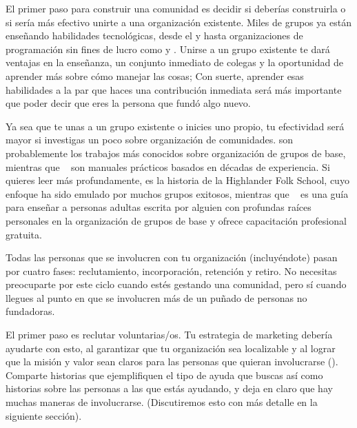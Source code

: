 El primer paso para construir una comunidad es decidir si deberías construirla
o si sería más efectivo unirte a una organización existente.
Miles de grupos ya están enseñando habilidades tecnológicas,
desde el 
y 
hasta organizaciones de programación sin fines de lucro como
y .
Unirse a un grupo existente te dará ventajas en la enseñanza,
un conjunto inmediato de colegas
y la oportunidad de aprender más sobre cómo manejar las cosas;
Con suerte,
aprender esas habilidades a la par que haces una contribución inmediata
será más importante que poder decir que
eres la persona que fundó algo nuevo.

Ya sea que te unas a un grupo existente o inicies uno propio,
tu efectividad será mayor si investigas un poco sobre organización de comunidades.
\cite{Alin1989,Lake2018} son probablemente los trabajos más conocidos sobre organización de grupos de base,
mientras que ~\cite{Brow2007,Midw2010,Lake2018} son manuales prácticos basados en décadas de experiencia.
Si quieres leer más profundamente,
\cite{Adam1975} es la historia de la Highlander Folk School,
cuyo enfoque ha sido emulado por muchos grupos exitosos,
mientras que ~\cite{Spal2014} es una guía para enseñar a personas adultas
escrita por alguien con profundas raíces personales en la organización de grupos de base
y 
ofrece capacitación profesional gratuita.


Todas las personas que se involucren con tu organización
(incluyéndote)
pasan por cuatro fases:
reclutamiento, incorporación, retención y retiro.
No necesitas preocuparte por este ciclo cuando estés gestando una comunidad,
pero sí cuando llegues al punto en que se involucren más de un puñado de personas no fundadoras.

El primer paso es reclutar voluntarias/os.
Tu estrategia de marketing debería ayudarte con esto, al garantizar que tu organización sea localizable
y al lograr que la misión y valor sean claros
para las personas que quieran involucrarse ().
Comparte historias que ejemplifiquen el tipo de ayuda que buscas 
así como historias sobre las personas a las que estás ayudando,
y deja en claro que hay muchas maneras de involucrarse.
(Discutiremos esto con más detalle en la siguiente sección).

